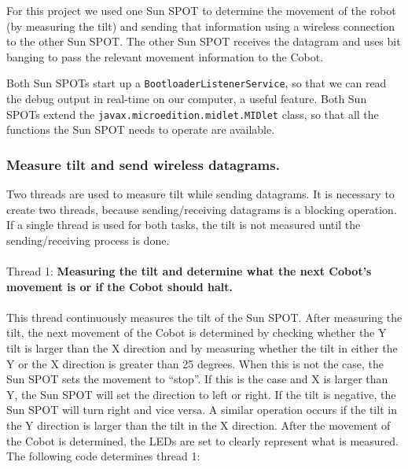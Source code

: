 \documentclass[a4paper,10pt]{article} %
\begin{document}
For this project we used one Sun SPOT to determine the movement of the robot (by
measuring the tilt) and sending that information using a wireless connection to
the other Sun SPOT. The other Sun SPOT receives the datagram and uses
bit banging to pass the relevant movement information to the Cobot. 

Both Sun SPOTs start up a \texttt{BootloaderListenerService}, so that we can
read the debug output in real-time on our computer, a useful feature. Both
Sun SPOTs extend the \texttt{javax.microedition.midlet.MIDlet} class, so that all
the functions the Sun SPOT needs to operate are available.

\subsubsection{Measure tilt and send wireless datagrams.} %

Two threads are used to measure tilt while sending datagrams. It is
necessary to create two threads, because sending/receiving datagrams is a
blocking operation. If a single thread is used for both tasks, the tilt is not
measured until the sending/receiving process is done.
\\
\\
\noindent Thread 1: \textbf{Measuring the tilt and determine what the next Cobot's
movement is or if the Cobot should halt.}
\\
\\
This thread continuously measures the tilt of the Sun SPOT. After measuring the
tilt, the next movement of the Cobot is determined by checking whether the Y
tilt is larger than the X direction and by measuring whether the tilt in either
the Y or the X direction is greater than 25 degrees. When this is not the case,
the Sun SPOT sets the movement to ``stop''. If this is the case and X is larger
than Y, the Sun SPOT will set the direction to left or right. If the tilt is
negative, the Sun SPOT will turn right and vice versa. A similar operation
occurs if the tilt in the Y direction is larger than the tilt in the X
direction. After the movement of the Cobot is determined, the LEDs are set to
clearly represent what is measured. The following code determines thread 1:


\end{document}
